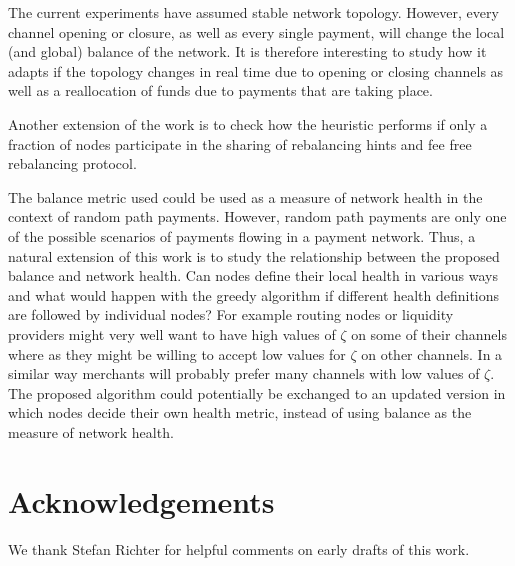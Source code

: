 \documentclass[a4paper]{paper}
\begin{document}
The current experiments have assumed stable network topology. 
However, every channel opening or closure, as well as every single payment, will change the local (and global) balance of the network.
It is therefore interesting to study how it adapts if the topology changes in real time due to opening or closing channels as well as a reallocation of funds due to payments that are taking place. 

Another extension of the work is to check how the heuristic performs if only a fraction of nodes participate in the sharing of rebalancing hints and fee free rebalancing protocol.

The balance metric used could be used as a measure of network health in the context of random path payments. 
However, random path payments are only one of the possible scenarios of payments flowing in a payment network. 
Thus, a natural extension of this work is to 
study the relationship between the proposed balance and network health. Can nodes define their local health in various ways and what would happen with the greedy algorithm if different health definitions are followed by individual nodes?
For example routing nodes or liquidity providers might very well want to have high values of $\zeta$ on some of their channels where as they might be willing to accept low values for $\zeta$ on other channels.
In a similar way merchants will probably prefer many channels with low values of $\zeta$.
The proposed algorithm could potentially be exchanged to an updated version in which nodes decide their own health metric,
instead of using balance as the measure of network health.


\section{Acknowledgements}
\label{sec:ack}
We thank Stefan Richter for helpful comments on early drafts of this work.



\end{document}
